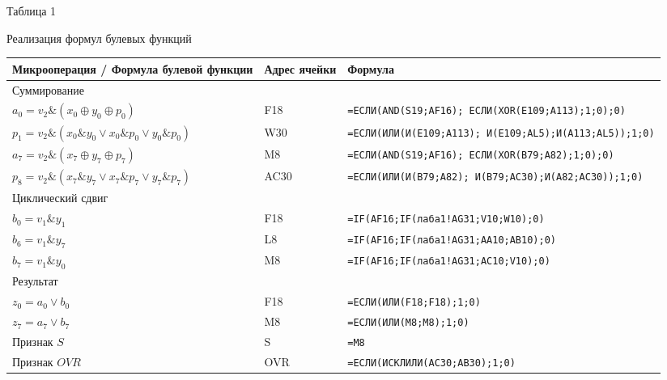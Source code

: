 \documentclass[oneside,a4paper,14pt]{extarticle}
\begin{document}
\begin{flushright}
	Таблица 1
\end{flushright}
\begin{center}
	Реализация формул булевых функций\\
\end{center}
\begin{small}
	\begin{tabular}{|p{5.6cm}|p{1.8cm}|p{8.6cm}|}
		\hline
		Микрооперация / Формула булевой функции         & Адрес ячейки & Формула                                                              \\
		\hline
		Суммирование                                    &              &                                                                      \\
		\hline
		$a_0=v_2\&(x_0\oplus y_0\oplus p_0)$            & F18          & \texttt{=ЕСЛИ(AND(S19;AF16);       ЕСЛИ(XOR(E109;A113);1;0);0)}      \\
		\hline
		$p_1=v_2\&(x_0\&y_0\vee x_0\&p_0\vee y_0\&p_0)$ & W30          & \texttt{=ЕСЛИ(ИЛИ(И(E109;A113);       И(E109;AL5);И(A113;AL5));1;0)} \\
		\hline
		$a_7=v_2\&(x_7\oplus y_7\oplus p_7)$            & M8           & \texttt{=ЕСЛИ(AND(S19;AF16);      ЕСЛИ(XOR(B79;A82);1;0);0)}         \\
		\hline
		$p_8=v_2\&(x_7\&y_7\vee x_7\&p_7\vee y_7\&p_7)$ & AC30         & \texttt{=ЕСЛИ(ИЛИ(И(B79;A82);        И(B79;AC30);И(A82;AC30));1;0)}  \\
		\hline
		Циклический сдвиг                               &              &                                                                      \\
		\hline
		$b_0=v_1\&y_1$                                  & F18          & \texttt{=IF(AF16;IF(лаба1!AG31;V10;W10);0)}                          \\
		\hline
		$b_6=v_1\&y_7$                                  & L8           & \texttt{=IF(AF16;IF(лаба1!AG31;AA10;AB10);0)}                        \\
		\hline
		$b_7=v_1\&y_0$                                  & M8           & \texttt{=IF(AF16;IF(лаба1!AG31;AC10;V10);0)}                         \\
		\hline
		Результат                                       &              &                                                                      \\
		\hline
		$z_0=a_0\vee b_0$                               & F18          & \texttt{=ЕСЛИ(ИЛИ(F18;F18);1;0)}                                     \\
		\hline
		$z_7=a_7\vee b_7$                               & M8           & \texttt{=ЕСЛИ(ИЛИ(M8;M8);1;0)}                                       \\
		\hline
		Признак $S$                                     & S            & \texttt{=M8}                                                         \\
		\hline
		Признак $OVR$                                   & OVR          & \texttt{=ЕСЛИ(ИСКЛИЛИ(AC30;AB30);1;0)}                               \\
		\hline
	\end{tabular}
\end{small}
\newpage
\end{document}
